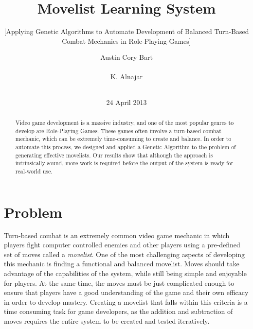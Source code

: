 \documentclass{acm_proc_article-sp}
\begin{document}
\title{Movelist Learning System}
\subtitle{[Applying Genetic Algorithms to Automate Development of Balanced Turn-Based Combat Mechanics in Role-Playing-Games]}



\author{
\alignauthor
Austin Cory Bart\\
       \\
\alignauthor
K. Alnajar\\
       \\
\alignauthor
}

\date{24 April 2013}

\maketitle
\begin{abstract}
Video game development is a massive industry, and one of the most popular genres to develop are Role-Playing Games. These games often involve a turn-based combat mechanic, which can be extremely time-consuming to create and balance. In order to automate this process, we designed and applied a Genetic Algorithm to the problem of generating effective movelists. Our results show that although the approach is intrinsically sound, more work is required before the output of the system is ready for real-world use.
\end{abstract}




\section{Problem}

Turn-based combat is an extremely common video game mechanic in which players fight computer controlled enemies and other players using a pre-defined set of moves called a \textit{movelist}. One of the most challenging aspects of developing this mechanic is finding a functional and balanced movelist. Moves should take advantage of the capabilities of the system, while still being simple and enjoyable for players. At the same time, the moves must be just complicated enough to ensure that players have a good understanding of the game and their own efficacy in order to develop mastery. Creating a movelist that falls within this criteria is a time consuming task for game developers, as the addition and subtraction of moves requires the entire system to be created and tested iteratively. 
\end{document}
